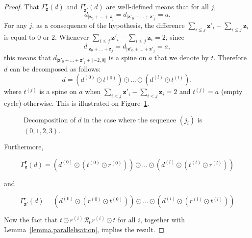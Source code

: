 \documentclass{article}
\begin{document}
\begin{proof}
That $\Gamma^{\textbf{r}}_{\textbf{z}}(d)$ and $\Gamma^{\textbf{r}}_{\textbf{z}'}(d)$ are well-defined means that for all $j$,
\[d_{|\textbf{z}_0 + \ldots +\textbf{z}_{j}} = d_{|\textbf{z}'_0 + \ldots +\textbf{z}'_{j}} = a.\]
For any $j$, as a consequence of the hypothesis, the difference $\sum_{i \le j}\textbf{z}'_i - \sum_{i \le j}\textbf{z}_i$ is equal to $0$ or $2$. Whenever $\sum_{i \le j}\textbf{z}'_i - \sum_{i \le j}\textbf{z}_i = 2$,
since 
\[d_{|\textbf{z}_0 + \ldots +\textbf{z}_{j}} = d_{|\textbf{z}'_0 + \ldots +\textbf{z}'_{j}} = a,\]
this means that $d_{|\textbf{z}'_0 + \ldots +\textbf{z}'_{j}+\llbracket-2, 0\rrbracket}$ is a spine on $a$ that we denote by $t$. Therefore $d$ can be decomposed as follows: 
\[d = \left(d^{(0)} \odot t^{(0)}\right) \odot \ldots \odot \left(d^{(l)} \odot t^{(l)}\right),\]
where $t^{(j)}$ is a spine on $a$ when $\sum_{i<j}\textbf{z}'_i - \sum_{i<j}\textbf{z}_i = 2$ and $t^{(j)} =a$ (empty cycle) otherwise.
This is illustrated on Figure~\ref{fig:decomp}.
\begin{figure}[h!]
\caption{Decomposition of $d$ in the case where the sequence $(j_i)$ is $(0,1,2,3)$.}\label{fig:decomp}
\end{figure}

Furthermore, 

\[\Gamma^{\textbf{r}}_{\textbf{z}}(d) =  \left( d^{(0)} \odot \left( t^{(0)} \odot r^{(0)} \right) \right) \odot  \ldots \odot \left(d^{(l)} \odot \left( t^{(l)} \odot r^{(l)} \right)\right)\]

and

\[\Gamma^{\textbf{r}}_{\textbf{z}'}(d) =  \left( d^{(0)} \odot \left( r^{(0)} \odot t^{(0)} \right) \right) \odot  \ldots \odot \left(d^{(l)} \odot \left( r^{(l)} \odot t^{(l)} \right)\right)\]

Now the fact that $t\odot r^{(i)} \mathcal{R}_0 r^{(i)}\odot t$ for all $i$, together with Lemma~\ref{lemma.parallelisation}, implies the result.
\end{proof}
\end{document}

